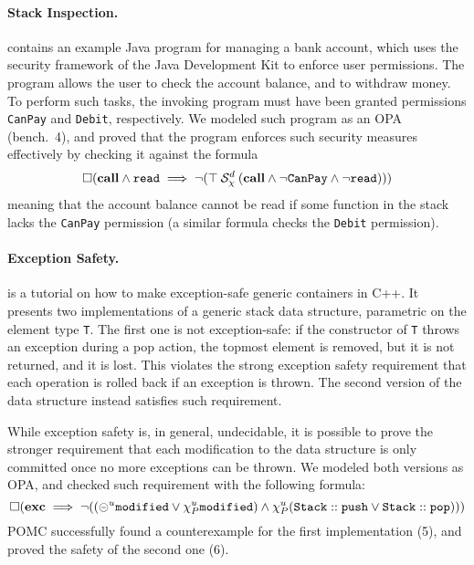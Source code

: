 \documentclass[9pt,a4paper]{article}
\begin{document}
\paragraph{Stack Inspection.}
\cite{JensenLT99} contains an example Java program for managing a bank
account, which uses the security framework of the Java Development Kit
to enforce user permissions. The program allows the user to check the
account balance, and to withdraw money. To perform such tasks, the
invoking program must have been granted permissions \texttt{CanPay}
and \texttt{Debit}, respectively.  We modeled such program as an OPA
(bench.\ 4), and proved that the program enforces such security
measures effectively by checking it against the formula
\[
\square (\mathbf{call} \land \mathtt{read} \implies
  \neg ({\top} \mathbin{\mathcal{S}_\chi^d} {(\mathbf{call} \land
                         \neg \mathtt{CanPay}
                         \land \neg \mathtt{read})}))
\]
meaning that the account balance cannot be read if some function in
the stack lacks the \texttt{CanPay} permission (a similar formula
checks the \texttt{Debit} permission).

\paragraph{Exception Safety.}
\cite{Sutter97} is a tutorial on how to make exception-safe generic
containers in C++. It presents two implementations of a generic stack
data structure, parametric on the element type \texttt{T}. The first
one is not exception-safe: if the constructor of \texttt{T} throws an
exception during a pop action, the topmost element is removed, but it
is not returned, and it is lost.  This violates the strong exception
safety \cite{Abrahams00} requirement that each operation is rolled
back if an exception is thrown. The second version of the data
structure instead satisfies such requirement.

While exception safety is, in general, undecidable, it is possible to
prove the stronger requirement that each modification to the data
structure is only committed once no more exceptions can be thrown.
We modeled both versions as OPA, and checked
such requirement with the following formula:
\[
\square (\mathbf{exc} \implies
         \neg ((\circleddash^u \mathtt{modified} \lor
               \chi_P^{u} \mathtt{modified})
         \land \chi_P^{u} (\mathtt{Stack::push} \lor \mathtt{Stack::pop})))
\]
POMC successfully found a counterexample for the first implementation (5),
and proved the safety of the second one (6).
\end{document}
